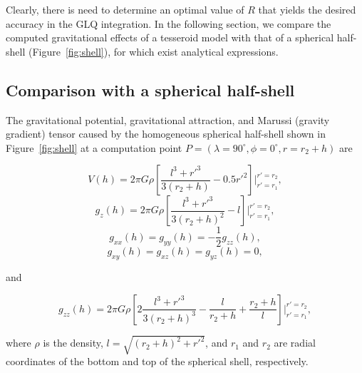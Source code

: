 \documentclass[paper,twocolumn,twoside]{geophysics}
\begin{document}
Clearly,
there is need to determine
an optimal value of $R$
that yields the desired accuracy
in the GLQ integration.
In the following section,
we compare the computed gravitational effects
of a tesseroid model
with that of a spherical half-shell
(Figure~\ref{fig:shell}),
for which exist analytical expressions.


\subsection{Comparison with a spherical half-shell}

The gravitational potential,
gravitational attraction,
and
Marussi (gravity gradient) tensor
caused by the homogeneous spherical half-shell
shown in Figure~\ref{fig:shell}
at a computation point
$P = (\lambda=90^\circ, \phi=0^\circ, r=r_2+h)$
are

\begin{equation}
    V(h) = 2\pi G \rho \left[
        \dfrac{l^3 + {r'}^3}{3(r_2 + h)} - 0.5 {r'}^2 \right]
         \Biggr \rvert_{r'=r_1}^{r'=r_2},
    \label{eq:shellpot}
\end{equation}
\begin{equation}
    g_z(h) = 2\pi G \rho \left[
        \dfrac{l^3 + {r'}^3}{3(r_2 + h)^2} - l \right]
        \Biggr \rvert_{r'=r_1}^{r'=r_2},
    \label{eq:shellgz}
\end{equation}
\begin{equation}
    g_{xx}(h) = g_{yy}(h) = -\dfrac{1}{2} g_{zz}(h),
\end{equation}
\begin{equation}
    g_{xy}(h) = g_{xz}(h) = g_{yz}(h) = 0,
\end{equation}

\noindent
and

\begin{equation}
    g_{zz}(h) = 2\pi G \rho \left[
        2\dfrac{l^3 + {r'}^3}{3(r_2 + h)^3}
        - \dfrac{l}{r_2 + h} + \dfrac{r_2 + h}{l}
        \right]
        \Biggr \rvert_{r'=r_1}^{r'=r_2},
    \label{eq:shellgzz}
\end{equation}

\noindent
where $\rho$ is the density,
$l = \sqrt{(r_2 + h)^2 + {r'}^2}$,
and
$r_1$ and $r_2$ are radial coordinates of
the bottom and top of the spherical shell,
respectively.
\end{document}
